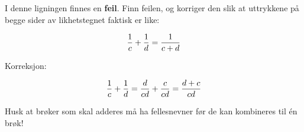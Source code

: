 

I denne ligningen finnes en {\bf feil}. Finn feilen, og korriger den slik at uttrykkene på begge sider av likhetstegnet faktisk er like:

$${1 \over c} + {1 \over d} = {1 \over {c + d}}$$







Korreksjon:

$${1 \over c} + {1 \over d} = {d \over cd} + {c \over cd} = {{d + c} \over cd}$$







Husk at brøker som skal adderes må ha fellesnevner før de kan kombineres til én brøk!



